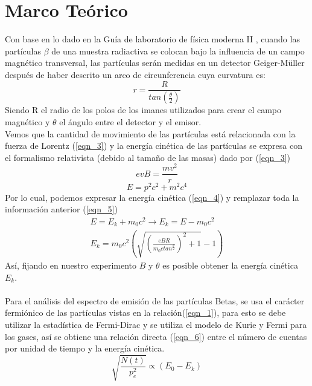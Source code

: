 \documentclass[10pt,twocolumns,letterpaper]{article}
\begin{document}
\section{Marco Teórico}
Con base en lo dado en la Guía de laboratorio de física moderna II \cite{b3}, cuando las partículas $\beta$ de una muestra radiactiva se colocan bajo la influencia de un campo magnético transversal, las partículas serán medidas en un detector Geiger-Müller después de haber descrito un arco de circunferencia cuya curvatura es:
\begin{equation}\label{eqn_2}
    r=\frac{R}{tan(\frac{\theta}{2})}
\end{equation}
Siendo R el radio de los polos de los imanes utilizados para crear el campo magnético y $\theta$ el ángulo entre el detector y el emisor.\\
Vemos que la cantidad de movimiento de las partículas está relacionada con la fuerza de Lorentz (\ref{eqn_3}) y la energía cinética de las partículas se expresa con el formalismo relativista (debido al tamaño de las masas) dado por (\ref{eqn_3})
\begin{equation}\label{eqn_3}
   evB=\frac{mv^2}{r}
\end{equation}
\begin{equation}\label{eqn_4}
    E= p^2 c^2 + m^2 c^4 
\end{equation}
Por lo cual, podemos expresar la energía cinética (\ref{eqn_4}) y remplazar toda la información anterior (\ref{eqn_5})
\begin{gather}
    E = E_k + m_0 c^2 \longrightarrow E_k = E - m_0 c^2 \label{eqn_5}\\
   E_k = m_0 c^2\left(\sqrt{\left(\frac{e B R}{m_0 c tan^\frac{\theta}{2}}\right)^2+1}-1\right) \label{eqn_6}
\end{gather}
Así, fijando en nuestro experimento $B$ y $\theta$ es posible obtener la energía cinética $E_k$. \\ \\
Para el análisis del espectro de emisión de las partículas Betas, se usa el carácter fermiónico de las partículas vistas en la relación(\ref{eqn_1}), para esto se debe utilizar la estadística de Fermi-Dirac y se utiliza el modelo de Kurie y Fermi para los gases, así se obtiene una relación directa (\ref{eqn_6}) entre el número de cuentas por unidad de tiempo y la energía cinética.
\begin{equation}\label{eqn_7}
    \sqrt{\frac{N(t)}{p^2_e}} \propto (E_0 - E_k)
\end{equation}
\end{document}
